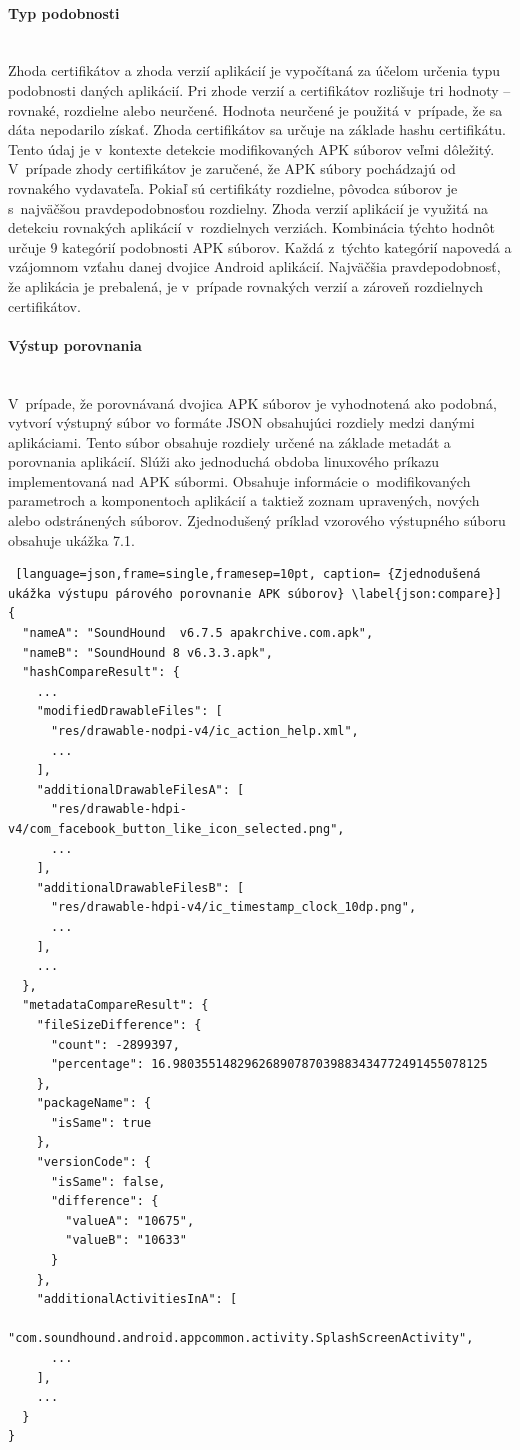 \paragraph{Typ podobnosti}\mbox{}\\
Zhoda certifikátov a zhoda verzií aplikácií je vypočítaná za účelom určenia typu podobnosti daných aplikácií. Pri zhode verzií a certifikátov rozlišuje tri hodnoty – rovnaké, rozdielne alebo neurčené. Hodnota neurčené je použitá v~prípade, že sa dáta nepodarilo získať. Zhoda certifikátov sa určuje na základe hashu certifikátu. Tento údaj je v~kontexte detekcie modifikovaných APK súborov veľmi dôležitý. V~prípade zhody certifikátov je zaručené, že APK súbory pochádzajú od rovnakého vydavateľa. Pokiaľ sú certifikáty rozdielne, pôvodca súborov je s~najväčšou pravdepodobnosťou rozdielny. Zhoda verzií aplikácií je využitá na detekciu rovnakých aplikácií v~rozdielnych verziách.
Kombinácia týchto hodnôt určuje 9 kategórií podobnosti APK súborov. Každá z~týchto kategórií napovedá a vzájomnom vzťahu danej dvojice Android aplikácií. Najväčšia pravdepodobnosť, že aplikácia je prebalená, je v~prípade rovnakých verzií a zároveň rozdielnych certifikátov. 

\paragraph{Výstup porovnania}\mbox{}\\
V~prípade, že porovnávaná dvojica APK súborov je vyhodnotená ako podobná,  vytvorí výstupný súbor vo formáte JSON obsahujúci rozdiely medzi danými aplikáciami. Tento súbor obsahuje rozdiely určené na základe metadát a porovnania aplikácií. Slúži ako jednoduchá obdoba linuxového príkazu  implementovaná nad APK súbormi. Obsahuje informácie o~modifikovaných parametroch a komponentoch aplikácií a taktiež zoznam upravených, nových alebo odstránených súborov. Zjednodušený príklad vzorového výstupného súboru obsahuje ukážka 7.1.
\begin{lstlisting} [language=json,frame=single,framesep=10pt, caption= {Zjednodušená ukážka výstupu párového porovnanie APK súborov} \label{json:compare}]
{
  "nameA": "SoundHound  v6.7.5 apakrchive.com.apk",
  "nameB": "SoundHound 8 v6.3.3.apk",
  "hashCompareResult": {
    ...
    "modifiedDrawableFiles": [
      "res/drawable-nodpi-v4/ic_action_help.xml",
      ...
    ],
    "additionalDrawableFilesA": [
      "res/drawable-hdpi-v4/com_facebook_button_like_icon_selected.png",
      ...
    ],
    "additionalDrawableFilesB": [
      "res/drawable-hdpi-v4/ic_timestamp_clock_10dp.png",
      ...
    ],
    ...
  },
  "metadataCompareResult": {
    "fileSizeDifference": {
      "count": -2899397,
      "percentage": 16.98035514829626890787039883434772491455078125
    },
    "packageName": {
      "isSame": true
    },
    "versionCode": {
      "isSame": false,
      "difference": {
        "valueA": "10675",
        "valueB": "10633"
      }
    },
    "additionalActivitiesInA": [
      "com.soundhound.android.appcommon.activity.SplashScreenActivity",
      ...
    ],
    ...
  }
}
\end{lstlisting}

